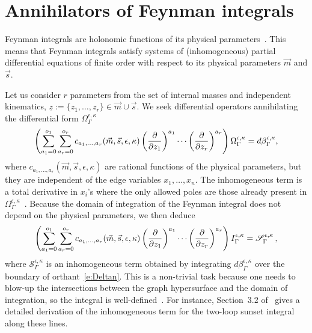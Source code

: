 \documentclass[a4paper,12pt]{article}
\numberwithin{equation}{section}
\numberwithin{figure}{section}
\begin{document}
\section{Annihilators of Feynman integrals}
\label{sec:Red}
Feynman integrals are holonomic functions of its physical parameters~\cite{Kashiwara:1977nf, Bitoun:2017nre, Smirnov:2010hn,Lee:2013hzt}. This means that Feynman integrals satisfy systems of  (inhomogeneous) partial
differential equations of finite order with respect to its physical
parameters $\vec m$ and $\vec s$.

Let us consider $r$ parameters from the set of internal masses and independent kinematics, $\underline z:=\{z_1,\dots,z_r\} \in \vec m \cup \vec s $. 
%
We seek 
differential operators 
annihilating the differential form $\Omega_\Gamma^{\epsilon,\kappa}$ 
\begin{equation}\label{e:PFOmegaGeneric}
	\left(  \sum_{a_1=0}^{o_1} \sum_{ a_r=0}^{o_r} c_{a_1,\dots,a_r}(\vec m,\vec s,\epsilon,\kappa)\left(\partial\over \partial z_1\right)^{a_1}\cdots\left(\partial
	\over\partial z_r\right)^{a_r}  \right)\Omega_\Gamma^{\epsilon,\kappa}=d\beta^{\epsilon,\kappa}_\Gamma,
\end{equation}
where $c_{a_1,\dots,a_r}(\vec m,\vec s,\epsilon,\kappa)$ are rational functions of the physical
parameters, but they are independent of the edge variables $x_1,\dots,x_n$. The inhomogeneous term is a total derivative in $x_i$'s where the only allowed poles are those already present in $\Omega_\Gamma^{\epsilon,\kappa}$~\cite{Lairez:2022zkj}.
%
Because the domain of integration of the Feynman integral does not
depend on the physical parameters, we then deduce
\begin{equation}\label{e:PDEintFeynman}
	\left( \sum_{a_1=0}^{o_1} \sum_{ a_r=0}^{o_r} c_{a_1,\dots,a_r}(\vec m,\vec s,\epsilon,\kappa)\left(\partial\over \partial z_1\right)^{a_1}\cdots\left(\partial
	\over\partial z_r\right)^{a_r}  \right)I^{\epsilon,\kappa}_\Gamma=\mathscr{S}^{\epsilon,\kappa}_\Gamma \, ,
\end{equation}
where $\mathscr{S}^{\epsilon,\kappa}_\Gamma$ is an inhomogeneous term obtained by
integrating $d\beta^{\epsilon,\kappa}_\Gamma$ over the boundary of
orthant~\eqref{e:Deltan}. This is a non-trivial task because one needs
to blow-up the intersections between the graph hypersurface and the
domain of integration, so the integral is well-defined~\cite{bek,Brown:2009ta,Bloch:2016izu,muller2014picard}. For
instance, 
Section~3.2 of~\cite{Bloch:2016izu} gives  a detailed derivation of the inhomogeneous term for
the two-loop sunset integral along these lines.
\end{document}

